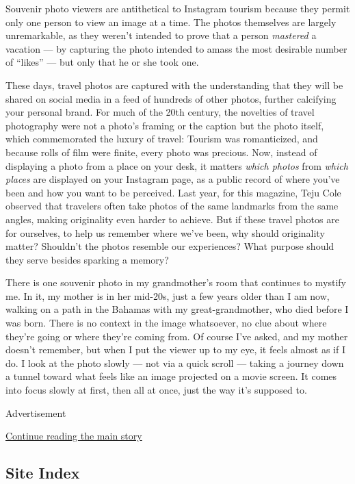 Souvenir photo viewers are antithetical to Instagram tourism because
they permit only one person to view an image at a time. The photos
themselves are largely unremarkable, as they weren't intended to prove
that a person \emph{mastered} a vacation --- by capturing the photo
intended to amass the most desirable number of ``likes'' --- but only
that he or she took one.

These days, travel photos are captured with the understanding that they
will be shared on social media in a feed of hundreds of other photos,
further calcifying your personal brand. For much of the 20th century,
the novelties of travel photography were not a photo's framing or the
caption but the photo itself, which commemorated the luxury of travel:
Tourism was romanticized, and because rolls of film were finite, every
photo was precious. Now, instead of displaying a photo from a place on
your desk, it matters \emph{which photos} from \emph{which places} are
displayed on your Instagram page, as a public record of where you've
been and how you want to be perceived. Last year, for this magazine,
Teju Cole observed that travelers often take photos of the same
landmarks from the same angles, making originality even harder to
achieve. But if these travel photos are for ourselves, to help us
remember where we've been, why should originality matter? Shouldn't the
photos resemble our experiences? What purpose should they serve besides
sparking a memory?

There is one souvenir photo in my grandmother's room that continues to
mystify me. In it, my mother is in her mid-20s, just a few years older
than I am now, walking on a path in the Bahamas with my
great-grandmother, who died before I was born. There is no context in
the image whatsoever, no clue about where they're going or where they're
coming from. Of course I've asked, and my mother doesn't remember, but
when I put the viewer up to my eye, it feels almost as if I do. I look
at the photo slowly --- not via a quick scroll --- taking a journey down
a tunnel toward what feels like an image projected on a movie screen. It
comes into focus slowly at first, then all at once, just the way it's
supposed to.

Advertisement

\protect\hyperlink{after-bottom}{Continue reading the main story}

\hypertarget{site-index}{%
\subsection{Site Index}\label{site-index}}

